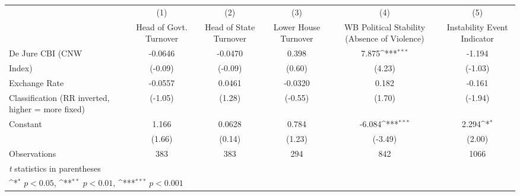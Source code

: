 {
\def\sym#1{\ifmmode^{#1}\else\(^{#1}\)\fi}
\begin{tabular}{l*{5}{c}}
\hline\hline
                    &\multicolumn{1}{c}{(1)}&\multicolumn{1}{c}{(2)}&\multicolumn{1}{c}{(3)}&\multicolumn{1}{c}{(4)}&\multicolumn{1}{c}{(5)}\\
                    &\multicolumn{1}{c}{Head of Govt. Turnover}&\multicolumn{1}{c}{Head of State Turnover}&\multicolumn{1}{c}{Lower House Turnover}&\multicolumn{1}{c}{WB Political Stability (Absence of Violence)}&\multicolumn{1}{c}{Instability Event Indicator}\\
\hline
De Jure CBI (CNW    &     -0.0646         &     -0.0470         &       0.398         &       7.875\sym{***}&      -1.194         \\
Index)              &     (-0.09)         &     (-0.09)         &      (0.60)         &      (4.23)         &     (-1.03)         \\
[1em]
Exchange Rate       &     -0.0557         &      0.0461         &     -0.0320         &       0.182         &      -0.161         \\
Classification (RR inverted, higher = more fixed)&     (-1.05)         &      (1.28)         &     (-0.55)         &      (1.70)         &     (-1.94)         \\
[1em]
Constant            &       1.166         &      0.0628         &       0.784         &      -6.084\sym{***}&       2.294\sym{*}  \\
                    &      (1.66)         &      (0.14)         &      (1.23)         &     (-3.49)         &      (2.00)         \\
\hline
Observations        &         383         &         383         &         294         &         842         &        1066         \\
\hline\hline
\multicolumn{6}{l}{\footnotesize \textit{t} statistics in parentheses}\\
\multicolumn{6}{l}{\footnotesize \sym{*} \(p<0.05\), \sym{**} \(p<0.01\), \sym{***} \(p<0.001\)}\\
\end{tabular}
}
